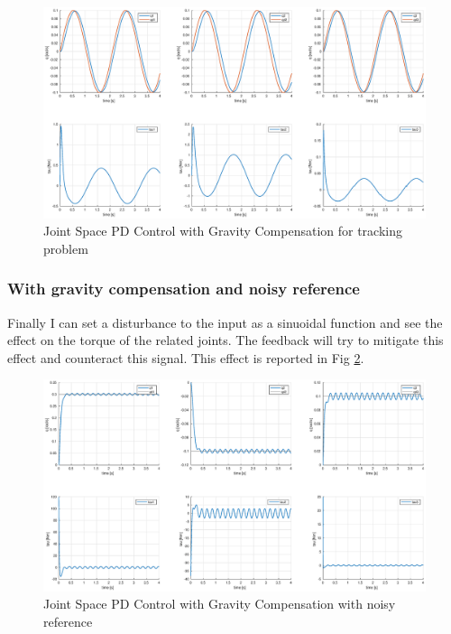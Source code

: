 \documentclass[a4paper,12pt]{article}
\begin{document}
\begin{figure}[H]
    \begin{center}
        \hspace*{-4.5cm}
        \includegraphics[scale=0.5]{images/gravity_comp_tracking.eps}
    \end{center}
    \caption{Joint Space PD Control with Gravity Compensation for tracking problem}
    \label{fig:gravity_comp_tracking}
\end{figure}

\subsubsection{With gravity compensation and noisy reference}

Finally I can set a disturbance to the input as a sinuoidal function and see the effect on the torque of the related joints. The feedback will try to mitigate this effect and counteract this signal. This effect is reported in Fig \ref{fig:gravity_comp_noise}.

\begin{figure}[H]
    \begin{center}
        \hspace*{-4.5cm}
        \includegraphics[scale=0.5]{images/gravity_comp_noise.eps}
    \end{center}
    \caption{Joint Space PD Control with Gravity Compensation with noisy reference}
    \label{fig:gravity_comp_noise}
\end{figure}
\end{document}
